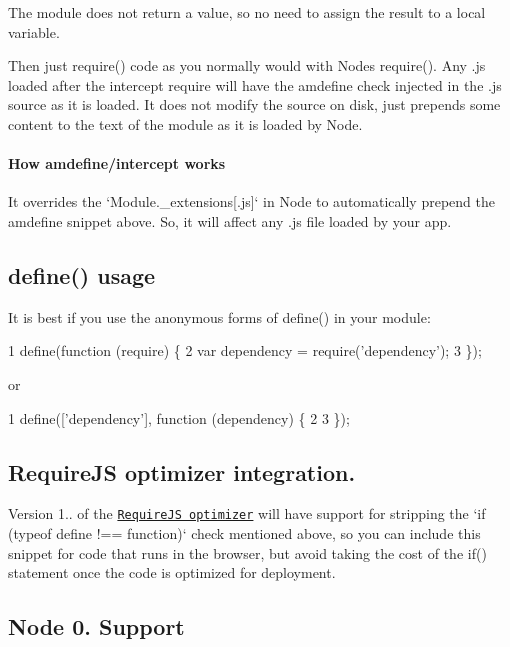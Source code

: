 The module does not return a value, so no need to assign the result to a local variable.

Then just require() code as you normally would with Node\textquotesingle{}s require(). Any .js loaded after the intercept require will have the amdefine check injected in the .js source as it is loaded. It does not modify the source on disk, just prepends some content to the text of the module as it is loaded by Node.

\paragraph*{How amdefine/intercept works}

It overrides the `\+Module.\+\_\+extensions\mbox{[}\textquotesingle{}.js\textquotesingle{}\mbox{]}` in Node to automatically prepend the amdefine snippet above. So, it will affect any .js file loaded by your app.

\subsection*{define() usage}

It is best if you use the anonymous forms of define() in your module\+:


\begin{DoxyCode}
1 define(function (require) \{
2     var dependency = require('dependency');
3 \});
\end{DoxyCode}


or


\begin{DoxyCode}
1 define(['dependency'], function (dependency) \{
2 
3 \});
\end{DoxyCode}


\subsection*{Require\+J\+S optimizer integration. \label{_optimizer}%
}

Version 1.. of the \href{http://requirejs.org/docs/optimization.html}{\tt Require\+J\+S optimizer} will have support for stripping the `if (typeof define !== \textquotesingle{}function\textquotesingle{})` check mentioned above, so you can include this snippet for code that runs in the browser, but avoid taking the cost of the if() statement once the code is optimized for deployment.

\subsection*{Node 0. Support}

